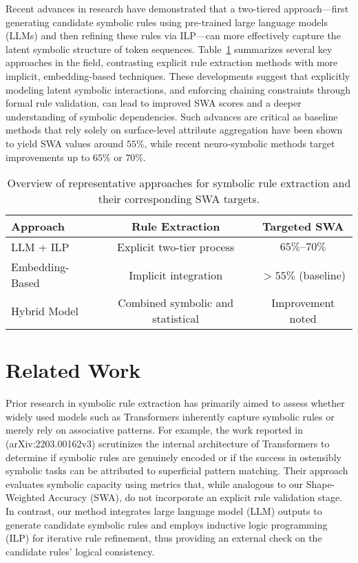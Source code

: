 \documentclass{article}
\begin{document}
Recent advances in research have demonstrated that a two-tiered approach—first generating candidate symbolic rules using pre-trained large language models (LLMs) and then refining these rules via ILP—can more effectively capture the latent symbolic structure of token sequences. Table~\ref{tab:background} summarizes several key approaches in the field, contrasting explicit rule extraction methods with more implicit, embedding-based techniques. These developments suggest that explicitly modeling latent symbolic interactions, and enforcing chaining constraints through formal rule validation, can lead to improved SWA scores and a deeper understanding of symbolic dependencies. Such advances are critical as baseline methods that rely solely on surface-level attribute aggregation have been shown to yield SWA values around \(55\%\), while recent neuro-symbolic methods target improvements up to \(65\%\) or \(70\%\).

\begin{table}[h]
\centering
\begin{tabular}{lcc}
\hline
Approach & Rule Extraction & Targeted SWA \\
\hline
LLM + ILP & Explicit two-tier process & \(65\%\text{--}70\%\) \\
Embedding-Based & Implicit integration & \(>55\%\) (baseline) \\
Hybrid Model & Combined symbolic and statistical & Improvement noted \\
\hline
\end{tabular}
\caption{Overview of representative approaches for symbolic rule extraction and their corresponding SWA targets.}
\label{tab:background}
\end{table}

\section{Related Work}
Prior research in symbolic rule extraction has primarily aimed to assess whether widely used models such as Transformers inherently capture symbolic rules or merely rely on associative patterns. For example, the work reported in (arXiv:2203.00162v3) scrutinizes the internal architecture of Transformers to determine if symbolic rules are genuinely encoded or if the success in ostensibly symbolic tasks can be attributed to superficial pattern matching. Their approach evaluates symbolic capacity using metrics that, while analogous to our Shape-Weighted Accuracy (SWA), do not incorporate an explicit rule validation stage. In contrast, our method integrates large language model (LLM) outputs to generate candidate symbolic rules and employs inductive logic programming (ILP) for iterative rule refinement, thus providing an external check on the candidate rules’ logical consistency.
\end{document}
